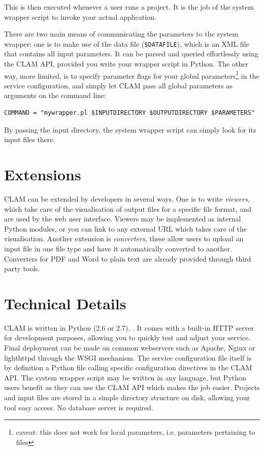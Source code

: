 \documentclass[11pt]{article}
\begin{document}
This is then executed whenever a user runs a project. It is the job of the system wrapper script to
invoke your actual application. 

There are two main means of communicating the parameters to the system
wrapper: one is to make use of the data file (\texttt{\$DATAFILE}), which is an XML file
that contains all input parameters. It can be parsed and queried effortlessly using the
CLAM API, provided you write your wrapper script in Python. The other way, more
limited, is to specify parameter flags for your global parameters\footnote{caveat: this does not work for local
parameters, i.e. parameters pertaining to files} in the service configuration, and simply
let CLAM pass all global parameters as arguments on the command line:

{\footnotesize{
\begin{verbatim}
COMMAND = "mywrapper.pl $INPUTDIRECTORY $OUTPUTDIRECTORY $PARAMETERS"
\end{verbatim}
}}

By passing the input directory, the system wrapper script can simply look for 
its input files there.

\section{Extensions}

CLAM can be extended by developers in several ways. One is to write
\emph{viewers}, which take care of the visualisation of output files for a
specific file format, and are used by the web user interface. Viewers may be
implemented as internal Python modules, or you can link to any external URL
which takes care of the visualisation. Another extension is
\emph{converters}, these allow users to upload an input file in one file type and have it
automatically converted to another. Converters for PDF and Word to plain text are already
provided through third party tools.

\section{Technical Details}

CLAM is written in Python (2.6 or 2.7), \cite{PYTHON}. It comes with a built-in HTTP server for
development purposes, allowing you to quickly test and adjust your service.
Final deployment can be made on common webservers such as Apache, Nginx or lighthttpd
through the WSGI mechanism. The service configuration file itself is by
definition a Python file calling specific configuration directives in the CLAM
API. The system wrapper script may be written in any language, but Python users
benefit as they can use the CLAM API which makes the job easier. Projects and
input files are stored in a simple directory structure on disk, allowing your
tool easy access. No database server is required.
\end{document}
